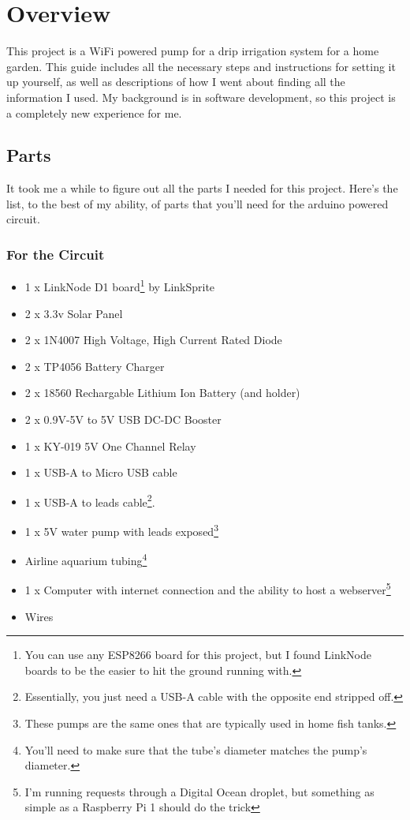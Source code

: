 \section{Overview}

This project is a WiFi powered pump for a drip irrigation system for a home garden.
This guide includes all the necessary steps and instructions for setting it up yourself, as well as descriptions of how I went about finding all the information I used.
My background is in software development, so this project is a completely new experience for me.

\subsection{Parts}
It took me a while to figure out all the parts I needed for this project.
Here's the list, to the best of my ability, of parts that you'll need for the arduino powered circuit.

\subsubsection*{For the Circuit}
\begin{multicols}{2}
    \begin{itemize}
        \item 1 x LinkNode D1 board\footnote{You can use any ESP8266 board for this project, but I found LinkNode boards to be the easier to hit the ground running with.} by LinkSprite
        \item 2 x 3.3v Solar Panel
        \item 2 x 1N4007 High Voltage, High Current Rated Diode
        \item 2 x TP4056 Battery Charger
        \item 2 x 18560 Rechargable Lithium Ion Battery (and holder)
        \item 2 x 0.9V-5V to 5V USB DC-DC Booster
        \item 1 x KY-019 5V One Channel Relay
        \item 1 x USB-A to Micro USB cable
        \item 1 x USB-A to leads cable\footnote{Essentially, you just need a USB-A cable with the opposite end stripped off.}.
        \item 1 x 5V water pump with leads exposed\footnote{These pumps are the same ones that are typically used in home fish tanks.}
        \item Airline aquarium tubing\footnote{You'll need to make sure that the tube's diameter matches the pump's diameter.}
        \item 1 x Computer with internet connection and the ability to host a webserver\footnote{I'm running requests through a Digital Ocean droplet, but something as simple as a Raspberry Pi 1 should do the trick}
        \item Wires
    \end{itemize}
\end{multicols}

